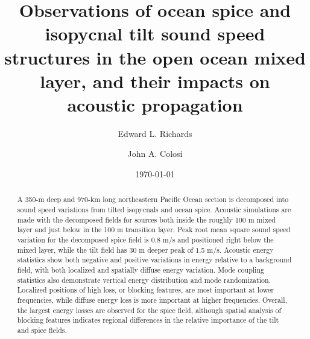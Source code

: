 \documentclass[preprint,NumberedRefs]{JASA}
\begin{document}
\title[Mixed layer tilt and spice]{Observations of ocean spice and isopycnal tilt sound speed structures in the open ocean mixed layer, and their impacts on acoustic propagation}
\author{Edward L. Richards}
\author{John A. Colosi}

\date{\today}

\begin{abstract}
A 350-m deep and 970-km long northeastern Pacific Ocean section is decomposed into sound speed variations from tilted isopycnals and ocean spice. Acoustic simulations are made with the decomposed fields for sources both inside the roughly 100 m mixed layer and just below in the 100 m transition layer. Peak root mean square sound speed variation for the decomposed spice field is 0.8 m/s and positioned right below the mixed layer, while the tilt field has 30 m deeper peak of 1.5 m/s. Acoustic energy statistics show both negative and positive variations in energy relative to a background field, with both localized and spatially diffuse energy variation. Mode coupling statistics also demonstrate vertical energy distribution and mode randomization. Localized positions of high loss, or blocking features, are most important at lower frequencies, while diffuse energy loss is more important at higher frequencies. Overall, the largest energy losses are observed for the spice field, although spatial analysis of blocking features indicates regional differences in the relative importance of the tilt and spice fields.
\end{abstract}

\maketitle
\end{document}
